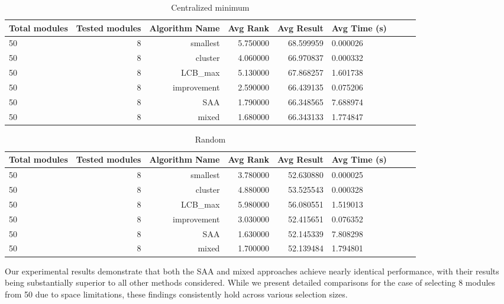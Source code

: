 \documentclass[opre,sglanonrev]{informs4}
\begin{document}
\begin{table}[H]
\centering
\caption{Centralized minimum}
\begin{tabular}{lrrrrlrrr}
\toprule
Total modules & Tested modules & Algorithm Name & Avg Rank & Avg Result & Avg Time (s) \\
\midrule	
50 & 8 & smallest & 5.750000 & 68.599959 & 0.000026 \\
50 & 8 & cluster & 4.060000 & 66.970837 & 0.000332 \\
50 & 8 & LCB\_max & 5.130000 & 67.868257 & 1.601738 \\
50 & 8 & improvement & 2.590000 & 66.439135 & 0.075206 \\
50 & 8 & SAA & 1.790000 & 66.348565 & 7.688974 \\
50 & 8 & mixed & 1.680000 & 66.343133 & 1.774847 \\
\bottomrule
\end{tabular}
\end{table}

\begin{table}[H]
\centering
\caption{Random}
\begin{tabular}{lrrrrlrrr}
\toprule
Total modules & Tested modules & Algorithm Name & Avg Rank & Avg Result & Avg Time (s) \\
\midrule	
50 & 8 & smallest & 3.780000 & 52.630880 & 0.000025 \\
50 & 8 & cluster & 4.880000 & 53.525543 & 0.000328 \\
50 & 8 & LCB\_max & 5.980000 & 56.080551 & 1.519013 \\
50 & 8 & improvement & 3.030000 & 52.415651 & 0.076352 \\
50 & 8 & SAA & 1.630000 & 52.145339 & 7.808298 \\ 
50 & 8 & mixed & 1.700000 & 52.139484 & 1.794801 \\
\bottomrule
\end{tabular}
\end{table}
Our experimental results demonstrate that both the SAA and mixed approaches achieve nearly identical performance, with their results being substantially superior to all other methods considered. While we present detailed comparisons for the case of selecting 8 modules from 50 due to space limitations, these findings consistently hold across various selection sizes.

\clearpage
\end{document}
